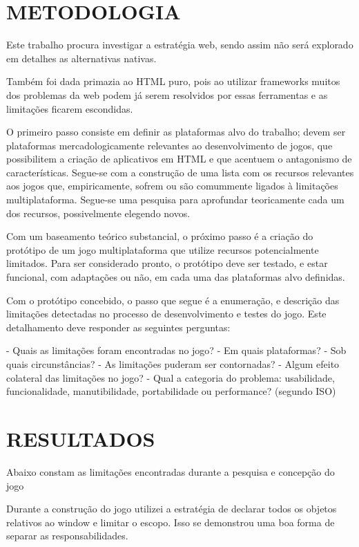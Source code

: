 \documentclass[11pt,a4paper]{article}
\begin{document}

\chapter{METODOLOGIA}

Este trabalho procura investigar a estratégia web, sendo assim não será explorado em detalhes as alternativas nativas.

Também foi dada primazia ao HTML puro, pois ao utilizar frameworks muitos dos problemas da web podem já serem resolvidos por essas ferramentas e as limitações ficarem escondidas.


O primeiro passo consiste em definir as plataformas alvo do trabalho; devem ser plataformas mercadologicamente relevantes ao desenvolvimento de jogos, que possibilitem a criação de aplicativos em HTML e que acentuem o antagonismo de características.
Segue-se com a construção de uma lista com os recursos relevantes aos jogos que, empiricamente, sofrem ou são comummente ligados à limitações multiplataforma. Segue-se uma pesquisa para aprofundar teoricamente cada um dos recursos, possivelmente elegendo novos.

Com um baseamento teórico substancial, o próximo passo é a criação do protótipo de um jogo multiplataforma que utilize recursos potencialmente limitados. Para ser considerado pronto, o protótipo deve ser testado, e estar funcional, com adaptações ou não, em cada uma das plataformas alvo definidas.

Com o protótipo concebido, o passo que segue é a enumeração, e descrição das limitações detectadas no processo de desenvolvimento e testes do jogo. Este detalhamento deve responder as seguintes perguntas:

- Quais as limitações foram encontradas no jogo?
- Em quais plataformas?
- Sob quais circunstâncias?
- As limitações puderam ser contornadas?
- Algum efeito colateral das limitações no jogo?
- Qual a categoria do problema: usabilidade, funcionalidade, manutibilidade, portabilidade ou performance? (segundo ISO)


\chapter{RESULTADOS}

Abaixo constam as limitações encontradas durante a pesquisa e concepção do jogo

Durante a construção do jogo utilizei a estratégia de declarar todos os objetos relativos ao window e limitar o escopo. Isso se demonstrou uma boa forma de separar as responsabilidades.
\end{document}

